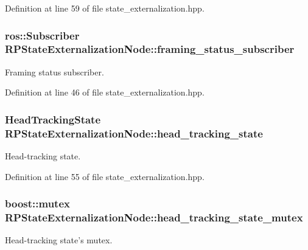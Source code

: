 \-Definition at line 59 of file state\-\_\-externalization.\-hpp.

\hypertarget{class_r_p_state_externalization_node_ae898595354bbe232f948f323a2b34f18}{
\subsubsection[{framing\-\_\-status\-\_\-subscriber}]{\setlength{\rightskip}{0pt plus 5cm}ros\-::\-Subscriber {\bf \-R\-P\-State\-Externalization\-Node\-::framing\-\_\-status\-\_\-subscriber}}}\label{class_r_p_state_externalization_node_ae898595354bbe232f948f323a2b34f18}
\-Framing status subscriber. 

\-Definition at line 46 of file state\-\_\-externalization.\-hpp.

\hypertarget{class_r_p_state_externalization_node_acc0c8e8552825d4a9303cf59307c71af}{
\subsubsection[{head\-\_\-tracking\-\_\-state}]{\setlength{\rightskip}{0pt plus 5cm}\-Head\-Tracking\-State {\bf \-R\-P\-State\-Externalization\-Node\-::head\-\_\-tracking\-\_\-state}}}\label{class_r_p_state_externalization_node_acc0c8e8552825d4a9303cf59307c71af}
\-Head-\/tracking state. 

\-Definition at line 55 of file state\-\_\-externalization.\-hpp.

\hypertarget{class_r_p_state_externalization_node_a2b35dbb15cc044ca7d0847d46569b234}{
\subsubsection[{head\-\_\-tracking\-\_\-state\-\_\-mutex}]{\setlength{\rightskip}{0pt plus 5cm}boost\-::mutex {\bf \-R\-P\-State\-Externalization\-Node\-::head\-\_\-tracking\-\_\-state\-\_\-mutex}}}\label{class_r_p_state_externalization_node_a2b35dbb15cc044ca7d0847d46569b234}
\-Head-\/tracking state's mutex. 


